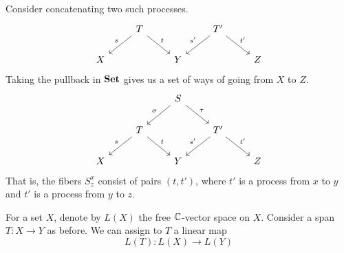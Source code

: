 \documentclass[main.tex]{subfiles}
\begin{document}
Consider concatenating two such processes.
\begin{equation*}
  \begin{tikzcd}
    & T
    \arrow[dl, swap, "s"]
    \arrow[dr, "t"]
    && T'
    \arrow[dl, swap, "s'"]
    \arrow[dr, "t'"]
    \\
    X
    && Y
    && Z
  \end{tikzcd}
\end{equation*}
Taking the pullback in $\mathbf{Set}$ gives us a set of ways of going from $X$ to $Z$.
\begin{equation*}
  \begin{tikzcd}
    && S
    \arrow[dl, swap, "\sigma"]
    \arrow[dr, "\tau"]
    \\
    & T
    \arrow[dl, swap, "s"]
    \arrow[dr, "t"]
    && T'
    \arrow[dl, swap, "s'"]
    \arrow[dr, "t'"]
    \\
    X
    && Y
    && Z
  \end{tikzcd}
\end{equation*}
That is, the fibers $S^{x}_{z}$ consist of pairs $(t, t')$, where $t'$ is a process from $x$ to $y$ and $t'$ is a process from $y$ to $z$.

For a set $X$, denote by $L(X)$ the free $\mathbb{C}$-vector space on $X$. Consider a span $T\colon X \to Y$ as before. We can assign to $T$ a linear map
\begin{equation*}
  L(T)\colon L(X) \to L(Y)
\end{equation*}
\end{document}

